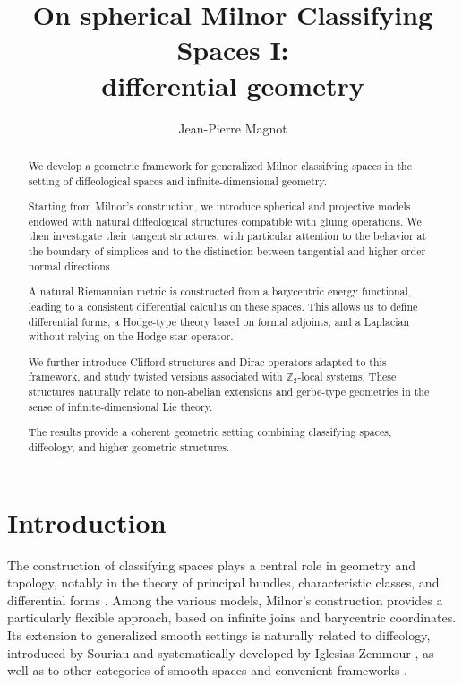 \documentclass[11pt]{amsart}
\title{
On spherical Milnor Classifying Spaces I:\\
differential geometry
}
\author{Jean-Pierre Magnot}
\begin{document}
\maketitle

\begin{abstract}
We develop a geometric framework for generalized Milnor classifying spaces in the setting of diffeological spaces and infinite-dimensional geometry.

Starting from Milnor's construction, we introduce spherical and projective models endowed with natural diffeological structures compatible with gluing operations. We then investigate their tangent structures, with particular attention to the behavior at the boundary of simplices and to the distinction between tangential and higher-order normal directions.

A natural Riemannian metric is constructed from a barycentric energy functional, leading to a consistent differential calculus on these spaces. This allows us to define differential forms, a Hodge-type theory based on formal adjoints, and a Laplacian without relying on the Hodge star operator.

We further introduce Clifford structures and Dirac operators adapted to this framework, and study twisted versions associated with $\mathbb{Z}_2$-local systems. These structures naturally relate to non-abelian extensions and gerbe-type geometries in the sense of infinite-dimensional Lie theory.

The results provide a coherent geometric setting combining classifying spaces, diffeology, and higher geometric structures.
\end{abstract}



\section{Introduction}

The construction of classifying spaces plays a central role in geometry and topology, notably in the theory of principal bundles, characteristic classes, and differential forms \cite{Milnor1956I,Milnor1956II,BottTu1982}. Among the various models, Milnor's construction provides a particularly flexible approach, based on infinite joins and barycentric coordinates. Its extension to generalized smooth settings is naturally related to diffeology, introduced by Souriau \cite{Souriau1980} and systematically developed by Iglesias-Zemmour \cite{IglesiasZemmour2013}, as well as to other categories of smooth spaces and convenient frameworks \cite{BaezHoffnungRogers2010,Stacey2011}.
\end{document}

